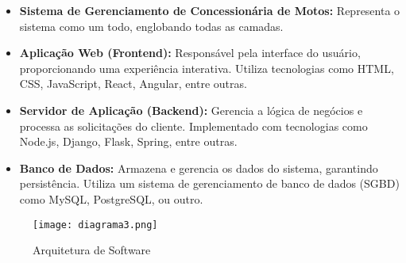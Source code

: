\begin{itemize}
	\item \textbf{Sistema de Gerenciamento de Concessionária de Motos:} Representa o sistema como um todo, englobando todas as camadas.
	
	\item \textbf{Aplicação Web (Frontend):} Responsável pela interface do usuário, proporcionando uma experiência interativa. Utiliza tecnologias como HTML, CSS, JavaScript, React, Angular, entre outras.
	
	\item \textbf{Servidor de Aplicação (Backend):} Gerencia a lógica de negócios e processa as solicitações do cliente. Implementado com tecnologias como Node.js, Django, Flask, Spring, entre outras.
	
	\item \textbf{Banco de Dados:} Armazena e gerencia os dados do sistema, garantindo persistência. Utiliza um sistema de gerenciamento de banco de dados (SGBD) como MySQL, PostgreSQL, ou outro.
\end{itemize}

\begin{figure}[h]
	\centering
	\texttt{[image: diagrama3.png]}
	\caption{Arquitetura de Software}
	\label{fig:diagrama1}
\end{figure}

